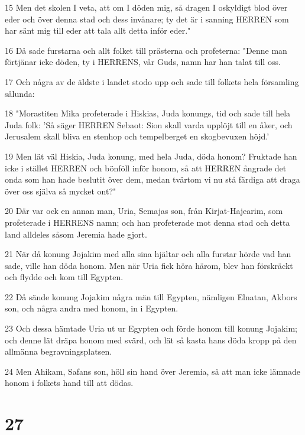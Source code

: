 \par 15 Men det skolen I veta, att om I döden mig, så dragen I oskyldigt blod över eder och över denna stad och dess invånare; ty det är i sanning HERREN som har sänt mig till eder att tala allt detta inför eder."
\par 16 Då sade furstarna och allt folket till prästerna och profeterna: "Denne man förtjänar icke döden, ty i HERRENS, vår Guds, namn har han talat till oss.
\par 17 Och några av de äldste i landet stodo upp och sade till folkets hela församling sålunda:
\par 18 "Morastiten Mika profeterade i Hiskias, Juda konungs, tid och sade till hela Juda folk: 'Så säger HERREN Sebaot: Sion skall varda upplöjt till en åker, och Jerusalem skall bliva en stenhop och tempelberget en skogbevuxen höjd.'
\par 19 Men lät väl Hiskia, Juda konung, med hela Juda, döda honom? Fruktade han icke i stället HERREN och bönföll inför honom, så att HERREN ångrade det onda som han hade beslutit över dem, medan tvärtom vi nu stå färdiga att draga över oss själva så mycket ont?"
\par 20 Där var ock en annan man, Uria, Semajas son, från Kirjat-Hajearim, som profeterade i HERRENS namn; och han profeterade mot denna stad och detta land alldeles såsom Jeremia hade gjort.
\par 21 När då konung Jojakim med alla sina hjältar och alla furstar hörde vad han sade, ville han döda honom. Men när Uria fick höra härom, blev han förskräckt och flydde och kom till Egypten.
\par 22 Då sände konung Jojakim några män till Egypten, nämligen Elnatan, Akbors son, och några andra med honom, in i Egypten.
\par 23 Och dessa hämtade Uria ut ur Egypten och förde honom till konung Jojakim; och denne lät dräpa honom med svärd, och lät så kasta hans döda kropp på den allmänna begravningsplatsen.
\par 24 Men Ahikam, Safans son, höll sin hand över Jeremia, så att man icke lämnade honom i folkets hand till att dödas.

\chapter{27}

